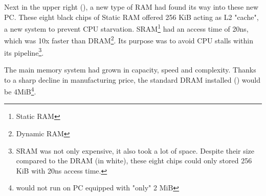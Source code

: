 \par
 Next in the upper right (), a new type of RAM had found its way into these new PC. These eight black chips of Static RAM offered 256 KiB acting as L2 "cache", a new system to prevent CPU starvation. SRAM\footnote{Static RAM} had an access time of 20ns, which was 10x faster than DRAM\footnote{Dynamic RAM}. Its purpose was to avoid CPU stalls within its pipeline\footnote{SRAM was not only expensive, it also took a lot of space. Despite their size compared to the DRAM (in white), these eight chips could only stored 256 KiB with 20ns access time.}. \\
\par
The main memory system had grown in capacity, speed and complexity. Thanks to a sharp decline in manufacturing price, the standard DRAM installed () would be 4MiB\footnote{\doom would not run on PC equipped with "only" 2 MiB}.


